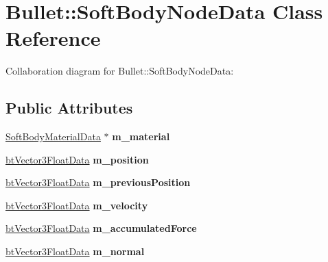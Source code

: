 \hypertarget{class_bullet_1_1_soft_body_node_data}{\section{Bullet\+:\+:Soft\+Body\+Node\+Data Class Reference}
\label{class_bullet_1_1_soft_body_node_data}
}


Collaboration diagram for Bullet\+:\+:Soft\+Body\+Node\+Data\+:
\subsection*{Public Attributes}
\begin{DoxyCompactItemize}
\item 
\hypertarget{class_bullet_1_1_soft_body_node_data_af5b1eae3267e4594d0de8c80f4fdebdb}{\hyperlink{class_bullet_1_1_soft_body_material_data}{Soft\+Body\+Material\+Data} $\ast$ {\bfseries m\+\_\+material}}\label{class_bullet_1_1_soft_body_node_data_af5b1eae3267e4594d0de8c80f4fdebdb}

\item 
\hypertarget{class_bullet_1_1_soft_body_node_data_a3461cadd92522ca130d4c5ef804d53b3}{\hyperlink{class_bullet_1_1bt_vector3_float_data}{bt\+Vector3\+Float\+Data} {\bfseries m\+\_\+position}}\label{class_bullet_1_1_soft_body_node_data_a3461cadd92522ca130d4c5ef804d53b3}

\item 
\hypertarget{class_bullet_1_1_soft_body_node_data_a43f46dd45e9dff63bddf2bbfe58f018f}{\hyperlink{class_bullet_1_1bt_vector3_float_data}{bt\+Vector3\+Float\+Data} {\bfseries m\+\_\+previous\+Position}}\label{class_bullet_1_1_soft_body_node_data_a43f46dd45e9dff63bddf2bbfe58f018f}

\item 
\hypertarget{class_bullet_1_1_soft_body_node_data_af0ca7a12d941807b007a9fe9822a8a2e}{\hyperlink{class_bullet_1_1bt_vector3_float_data}{bt\+Vector3\+Float\+Data} {\bfseries m\+\_\+velocity}}\label{class_bullet_1_1_soft_body_node_data_af0ca7a12d941807b007a9fe9822a8a2e}

\item 
\hypertarget{class_bullet_1_1_soft_body_node_data_a45796446b591d645aa34241fdd6f78d7}{\hyperlink{class_bullet_1_1bt_vector3_float_data}{bt\+Vector3\+Float\+Data} {\bfseries m\+\_\+accumulated\+Force}}\label{class_bullet_1_1_soft_body_node_data_a45796446b591d645aa34241fdd6f78d7}

\item 
\hypertarget{class_bullet_1_1_soft_body_node_data_a42a407dace5e8c855b4528335d6a9af7}{\hyperlink{class_bullet_1_1bt_vector3_float_data}{bt\+Vector3\+Float\+Data} {\bfseries m\+\_\+normal}}\label{class_bullet_1_1_soft_body_node_data_a42a407dace5e8c855b4528335d6a9af7}


\end{DoxyCompactItemize}
